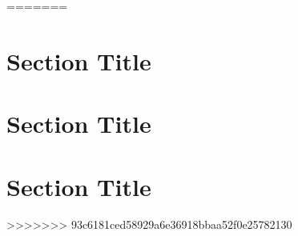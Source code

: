 \documentclass[12pt, a4paper]{IEEEtran}
\begin{document}
    

                
                
    

=======
\section{Section Title}
\blindtext

\section{Section Title}
\blindtext

\section{Section Title}
\blindtext
>>>>>>> 93c6181ced58929a6e36918bbaa52f0e25782130
\end{document}
